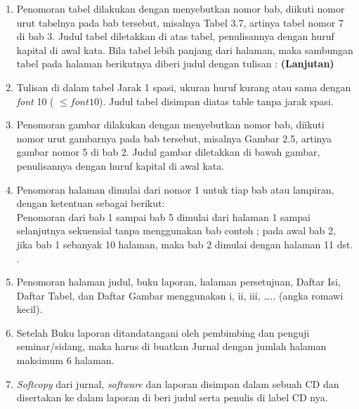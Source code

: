 \begin{itemize}
\begin{enumerate}
		\item Penomoran	 tabel	 dilakukan	 dengan	 menyebutkan	 nomor	 bab,	 diikuti	 nomor	 urut	tabelnya	pada	bab	tersebut,	misalnya	Tabel	3.7,	artinya	tabel	nomor 7	di	bab	3.	Judul	
tabel	 diletakkan	 di	 atas	 tabel,	 penulisannya	 dengan	 huruf	 kapital	 di	 awal	 kata.	 Bila	tabel	 lebih	 panjang	 dari	 halaman,	 maka	 sambungan	 tabel	 pada	 halaman	 berikutnya	
diberi	judul	dengan	tulisan	: \textbf{(Lanjutan)}
		\item Tulisan	di	dalam	tabel	Jarak	1 spasi,	ukuran	huruf kurang	atau	sama	dengan \textit{font} 10 ( $\leq \textit{font}  10$). 	Judul	tabel	disimpan diatas	table	tanpa	jarak	spasi.
		
		\item Penomoran	 gambar	 dilakukan	 dengan	menyebutkan	 nomor	 bab,	 diikuti	 nomor	 urut	gambarnya	pada	bab	tersebut,	misalnya		Gambar	2.5,	artinya	gambar	nomor	5	di	bab	
2.			 Judul	gambar	diletakkan	di	bawah	gambar,	penulisannya	dengan	huruf	kapital	di	awal	kata.

		\item Penomoran	 halaman	 dimulai	 dari	 nomor	 1	 untuk	 tiap	 bab	 atau	 lampiran,	 dengan	
ketentuan	sebagai	berikut:	\\
			Penomoran	 dari	 bab	 1	 sampai	 bab	 5	 dimulai	 dari	 halaman	 1	 sampai	 selanjutnya	sekuensial	tanpa	menggunakan	bab	contoh	;	pada	awal	bab	2,	jika	bab	1	sebanyak	10	halaman,	maka	bab	2	dimulai	dengan	halaman	11	dst. .
			
		\item Penomoran	 halaman	 judul,	 buku	 laporan,	 halaman	 	 persetujuan,	 Daftar	 Isi,	 Daftar	Tabel,	dan	Daftar		Gambar	menggunakan	i,		ii,		iii,	…..	(angka	romawi	kecil).
		
		\item Setelah	Buku	laporan	 ditandatangani	 oleh	 pembimbing	 dan	 penguji	 seminar/sidang,	
maka	harus	di	buatkan	Jurnal	dengan	jumlah	halaman	maksimum	6	halaman.

		\item \textit{Softcopy} dari	jurnal, \textit{software} dan	laporan	disimpan	dalam	sebuah	CD	dan	disertakan	
ke	dalam	laporan di	beri	judul	serta	penulis	di	label	CD	nya.

	\end{enumerate}
\end{itemize}

